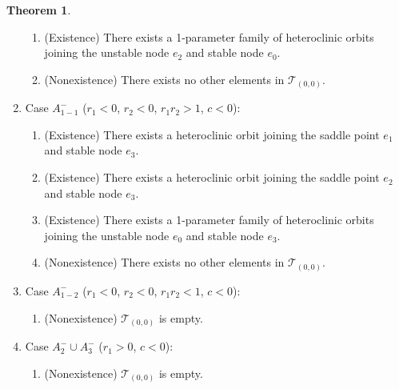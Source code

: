 \documentclass{amsart}
\theoremstyle{definition}
\newtheorem{theorem}{Theorem}
\numberwithin{equation}{section}
\begin{document}
\begin{theorem}
\begin{enumerate}
\begin{enumerate}
 \item (Existence) There exists a 1-parameter family of heteroclinic orbits joining the unstable node $e_2$ and stable node $e_0$.
 \item (Nonexistence) There exists no other elements in $\mathcal{T}_{(0,0)}$. 
 \end{enumerate}
 \item Case $A_{1-1}^-$ ($r_1<0$, $r_2<0$, $r_1r_2>1$, $c<0$):
\begin{enumerate}
 \item (Existence) There exists a heteroclinic orbit joining the saddle point $e_1$ and stable node $e_3$.
 \item (Existence) There exists a heteroclinic orbit joining the saddle point $e_2$ and stable node $e_3$.
 \item (Existence) There exists a 1-parameter family of heteroclinic orbits joining the unstable node $e_0$ and stable node $e_3$.
 \item (Nonexistence) There exists no other elements in $\mathcal{T}_{(0,0)}$.
\end{enumerate}
 \item Case $A_{1-2}^-$ ($r_1<0$, $r_2<0$, $r_1r_2<1$, $c<0$):
 \begin{enumerate}
  \item (Nonexistence) $\mathcal{T}_{(0,0)}$ is empty.
 \end{enumerate}
\item Case $A_{2}^- \cup A_3^-$ ($r_1>0$, $c<0$):
 \begin{enumerate}
  \item (Nonexistence) $\mathcal{T}_{(0,0)}$ is empty.
 \end{enumerate}
\end{enumerate}

% 
%  
\end{theorem}
\end{document}
